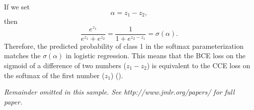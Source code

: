 \documentclass[twoside,11pt]{article}
\begin{document}
If we set 
\[
  \alpha = z_1 - z_2,
\]
then
\[
  \frac{e^{z_1}}{e^{z_1} + e^{z_2}}
  =
  \frac{1}{1 + e^{z_2 - z_1}}
  =
  \sigma(\alpha).
\]
Therefore, the predicted probability of class 1 in the softmax parameterization 
matches the \(\sigma(\alpha)\) in logistic regression. This means that 
the BCE loss on the sigmoid of a difference of two numbers ($z_1 - z_2$) 
is equivalent
to the CCE loss on the softmax of the first number
($z_1$) (\cite{Goodfellow-et-al-2016}).




{\noindent \em Remainder omitted in this sample. See http://www.jmlr.org/papers/ for full paper.}


\vskip 0.2in

\end{document}
